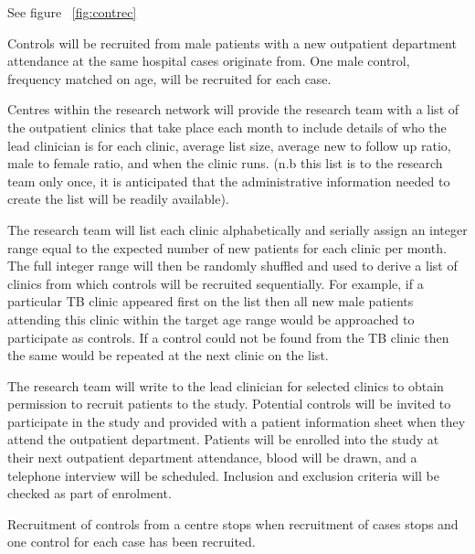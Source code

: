 \documentclass[a4paper,10pt]{article}
\begin{document}
See figure ~\ref{fig:contrec}

Controls will be recruited from male patients with a new outpatient department attendance at the same hospital cases originate from. One male control, frequency matched on age, will be recruited for each case.  

 Centres within the research network will provide the research team with a list of the outpatient clinics that take place each month to include details of who the lead clinician is for each clinic, average list size, average new to follow up ratio, male to female ratio, and when the clinic runs. (n.b this list is to the research team only once, it is anticipated that the administrative information needed to create the list will be readily available). 

The research team will list each clinic alphabetically and serially assign an integer range equal to the expected number of new patients for each clinic per month. The full integer range will then be randomly shuffled and used to derive a list of clinics from which controls will be recruited sequentially. For example, if a particular TB clinic appeared first on the list then all new male patients attending this clinic within the target age range would be approached to participate as controls. If
 a control could not be found from the TB clinic then the same would be repeated at the next clinic on the list.

The research team will write to the lead clinician for selected clinics to obtain permission to recruit patients to the study. Potential controls will be invited to participate in the study and provided with a patient information sheet when they attend the outpatient department. Patients will be enrolled into the study at their next outpatient department attendance, blood will be drawn, and a telephone interview will be scheduled. Inclusion and exclusion criteria will be checked as
part of enrolment.

Recruitment of controls from a centre stops when recruitment of cases stops and one control for each case has been recruited.
\end{document}
